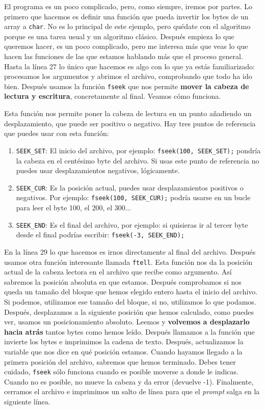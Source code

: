 \documentclass[a4paper]{article}
\begin{document}
El programa es un poco complicado, pero, como siempre, iremos por partes. Lo
primero que hacemos es definir una función que pueda invertir los bytes de un
array a \verb!char!. No es lo principal de este ejemplo, pero quédate con el
algoritmo porque es una tarea usual y un algoritmo clásico. Después empieza lo
que queremos hacer, es un poco complicado, pero me interesa más que veas lo que
hacen las funciones de las que estamos hablando más que el proceso general.
Hasta la línea 27 lo único que hacemos es algo con lo que ya estás
familiarizado: procesamos los argumentos y abrimos el archivo, comprobando que
todo ha ido bien. Después usamos la función \verb!fseek! que nos permite
\textbf{mover la cabeza de lectura y escritura}, concretamente al final. Veamos
cómo funciona.

Esta función nos permite poner la cabeza de lectura en un punto añadiendo un
desplazamiento, que puede ser positivo o negativo. Hay tres puntos de referencia
que puedes usar con esta función:
\begin{enumerate}
\item \verb!SEEK_SET!: El inicio del archivo, por ejemplo:
\verb!fseek(100, SEEK_SET);! pondría la cabeza en el centésimo byte del archivo.
Si usas este punto de referencia no puedes usar desplazamientos negativos,
lógicamente.
\item \verb!SEEK_CUR!: Es la posición actual, puedes usar desplazamientos
positivos o negativos. Por ejemplo: \verb!fseek(100, SEEK_CUR);! podría usarse
en un bucle para leer el byte 100, el 200, el 300...
\item \verb!SEEK_END!: Es el final del archivo, por ejemplo: si quisieras
ir al tercer byte desde el final podrías escribir: \verb!fseek(-3, SEEK_END);!
\end{enumerate}

En la línea 29 lo que hacemos es irnos directamente al final del archivo.
Después usamos otra función interesante llamada \verb!ftell!. Esta función nos
da la posición actual de la cabeza lectora en el archivo que recibe como
argumento. Así sabremos la posición absoluta en que estamos. Después comprobamos
si nos queda un tamaño del bloque que hemos elegido entero hasta el inicio del
archivo. Si podemos, utilizamos ese tamaño del bloque, si no, utilizamos
lo que podamos. Después, desplazamos a la siguiente posición que hemos
calculado, como puedes ver, usamos un posicionamiento absoluto. Leemos y
\textbf{volvemos a desplazarlo hacia atrás} tantos bytes como hemos leído.
Después llamamos a la función que invierte los bytes e imprimimos la cadena
de texto. Después, actualizamos la variable que nos dice en qué posición
estamos. Cuando hayamos llegado a la primera posición del archivo, sabremos que
hemos terminado. Debes tener cuidado, \verb!fseek! sólo funciona cuando es
posible moverse a donde le indicas. Cuando no es posible, no mueve la cabeza y
da error (devuelve -1). Finalmente, cerramos el archivo e imprimimos un salto
de línea para que el \textit{prompt} salga en la siguiente línea.
\end{document}
